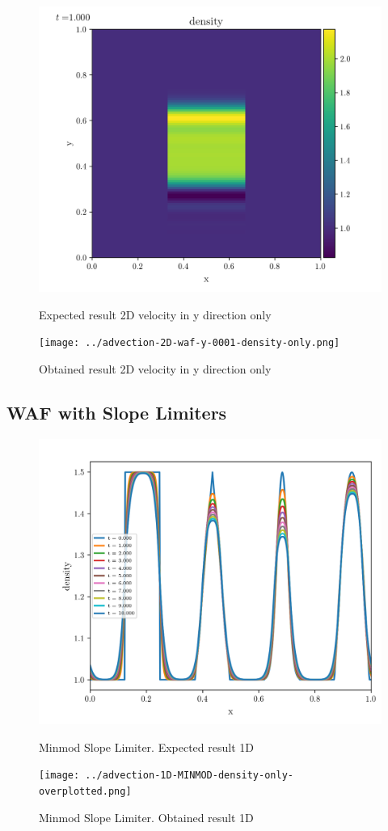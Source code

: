     \begin{figure}[htbp]
        \centering
        \includegraphics[width=.7\textwidth]{./figures/advection-2D-waf-y-0001-density-only.png}%
        \caption{Expected result 2D velocity in y direction only}
        \texttt{[image: ../advection-2D-waf-y-0001-density-only.png]}%
        \caption{Obtained result 2D velocity in y direction only}
    \end{figure}








\clearpage
\subsection{WAF with Slope Limiters}


    \begin{figure}[htbp]
        \centering
        \includegraphics[width=.7\textwidth]{./figures/advection-1D-MINMOD-density-only-overplotted.png}%
        \caption{Minmod Slope Limiter. Expected result 1D}
        \texttt{[image: ../advection-1D-MINMOD-density-only-overplotted.png]}%
        \caption{Minmod Slope Limiter. Obtained result 1D}
    \end{figure}

